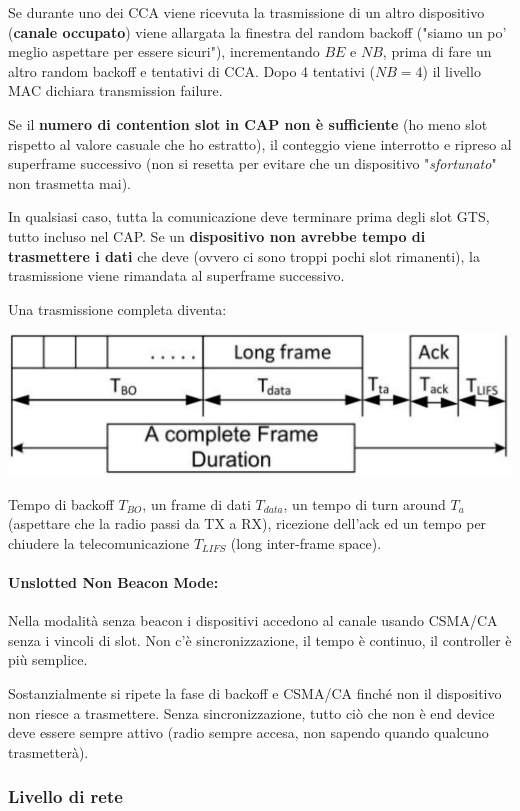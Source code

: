 Se durante uno dei CCA viene ricevuta la trasmissione di un altro dispositivo (\textbf{canale occupato}) viene allargata la finestra del random backoff ("siamo un po' meglio aspettare per essere sicuri"), incrementando $BE$ e $NB$, prima di fare un altro random backoff e tentativi di CCA. Dopo 4 tentativi ($NB=4$) il livello MAC dichiara transmission failure.

Se il \textbf{numero di contention slot in CAP non è sufficiente} (ho meno slot rispetto al valore casuale che ho estratto), il conteggio viene interrotto e ripreso al superframe successivo (non si resetta per evitare che un dispositivo "\textit{sfortunato}" non trasmetta mai).

In qualsiasi caso, tutta la comunicazione deve terminare prima degli slot GTS, tutto incluso nel CAP. Se un \textbf{dispositivo non avrebbe tempo di trasmettere i dati} che deve (ovvero ci sono troppi pochi slot rimanenti), la trasmissione viene rimandata al superframe successivo.

Una trasmissione completa diventa:
\begin{center}
	\includegraphics[width=0.7\linewidth]{img/wpan/ztran}
\end{center}

Tempo di backoff $T_{BO}$, un frame di dati $T_{data}$, un tempo di turn around $T_a$ (aspettare che la radio passi da TX a RX), ricezione dell'ack ed un tempo per chiudere la telecomunicazione $T_{LIFS}$ (long inter-frame space).

\paragraph{Unslotted Non Beacon Mode:} Nella modalità senza beacon i dispositivi accedono al canale usando CSMA/CA senza i vincoli di slot. Non c'è sincronizzazione, il tempo è continuo, il controller è più semplice.

Sostanzialmente si ripete la fase di backoff e CSMA/CA finché non il dispositivo non riesce a trasmettere. Senza sincronizzazione, tutto ciò che non è end device deve essere sempre attivo (radio sempre accesa, non sapendo quando qualcuno trasmetterà).

\subsubsection{Livello di rete}

